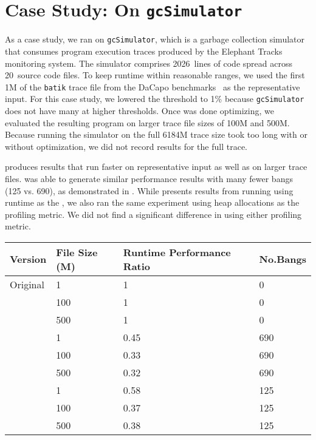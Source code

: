 \section{Case Study: \At{} On \texttt{gcSimulator}}
As a case study, we ran \At{} on \texttt{gcSimulator}, which is a
garbage collection simulator that consumes program execution traces
produced by the Elephant Tracks~\cite{Ricci13} monitoring system.  The
simulator comprises 2026~lines of code spread across 20~source code
files. To keep \Ao{} runtime within reasonable ranges, we used the
first 1M of the \texttt{batik} trace file from the DaCapo
benchmarks~\cite{Blackburn06} as the representative input.  For this
case study, we lowered the \absim{} threshold to 1\%
because \texttt{gcSimulator} does not have many \hotspots{} at higher
thresholds.  Once \At{} was done optimizing, we evaluated the
resulting program on larger trace file sizes of 100M and 500M. Because
running the simulator on the full 6184M trace size took too
long with or without optimization, we did not record results for the
full trace.

\Ao{} produces results that run
faster on representative input as well as on larger trace files.
\At{} was able to generate similar performance results with many fewer
bangs (125 vs. 690), as demonstrated in . 
While  presents results from running \At{} using runtime
as the \profm{}, we also ran the same experiment using heap
allocations as the profiling metric. We did not find a significant
difference in using either profiling metric.

\begin{table}
\centering
\begin{tabular}{p{3cm}p{3cm}p{5cm}p{1.5cm}}
\hline
Version   & File Size (M) & Runtime Performance Ratio& No.Bangs \\
\hline
Original      & 1       & 1         & 0   \\
              & 100     & 1         & 0 \\
              & 500     & 1         & 0 \\
\Ao{}         & 1       & 0.45      &  690\\
              & 100     & 0.33      &  690\\
              & 500     & 0.32      & 690\\
\At{}         & 1       &  0.58     & 125    \\
              & 100     & 0.37      & 125      \\
              & 500     & 0.38      & 125    \\

\hline
\end{tabular}
\label{tab:gc}
\end{table}
